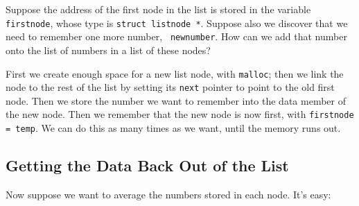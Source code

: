 Suppose the address of the first node in the list is stored in the
variable {\tt firstnode}, whose type is {\tt struct listnode *}.
Suppose also we discover that we need to remember one more number, {\tt
newnumber}.  How can we add that number onto the list of numbers in a
list of these nodes?

\begin{flushleft}
\verb% struct listnode *temp;% \\* 
\verb% % \\* 
\verb% temp = malloc(sizeof(struct listnode));% \\* 
\verb% % \\* 
\verb% (*temp).next = firstnode;% \\* 
\verb% (*temp).data = newnumber;% \\* 
\verb% firstnode = temp;% \\* 
\end{flushleft}

First we create enough space for a new list node, with {\tt malloc};
then we link the node to the rest of the list by setting its {\tt next}
pointer to point to the old first node.  Then we store the number we
want to remember into the data member of the new node.  Then we remember
that the new node is now first, with {\tt firstnode = temp}.  We can do
this as many times as we want, until the memory runs out.

\subsection{Getting the Data Back Out of the List}

Now suppose we want to average the numbers stored in each node.  It's
easy:

\begin{flushleft}
\verb% struct listnode *current;%  \\*
\verb% int average;%  \\*
\verb% long int sum = 0L;%  \\*
\verb% int nodecount = 0;%  \\*
\verb% %  \\*
\verb% for (current = firstnode; % \\*
\verb%      current != NULL; %  \\*
\verb%      current = (*current).next) {%  \\*
\verb%   sum += (*current).data; %  \\*
\verb%   nodecount += 1;%  \\*
\verb% }%  \\*
\verb% %  \\*
\verb% average = sum / nodecount; /* round down */ %  \\*
\end{flushleft}

